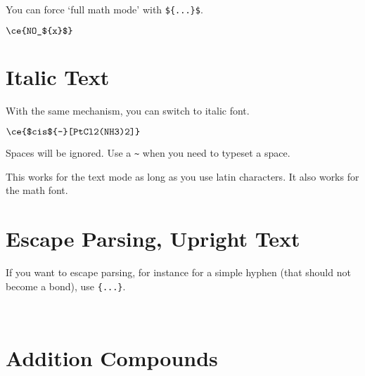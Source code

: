 \documentclass[a4paper,notitlepage,parskip=half]{scrreprt}
\begin{document}
You can force `full math mode' with \verb|${...}$|.

\begin{SideBySideExample}[xrightmargin=4cm]
  $\ce{NO_${x}$}$ \sffamily\bfseries {}
\end{SideBySideExample}


\section{Italic Text}

With the same mechanism, you can switch to italic font.

\begin{SideBySideExample}[xrightmargin=4cm]
  $\ce{$cis${-}[PtCl2(NH3)2]}$\\
  \sffamily\bfseries
\end{SideBySideExample}

Spaces will be ignored. Use a \verb|~| when you need to typeset a space.

This works for the text mode as long as you use latin characters. It also works for the math font.


\section{Escape Parsing, Upright Text}

If you want to escape parsing, for instance for a simple hyphen (that should not become a bond), use \verb|{...}|.

\begin{SideBySideExample}[xrightmargin=4cm]
  \\
  \sffamily\bfseries
\end{SideBySideExample}


\section{Addition Compounds}

\begin{SideBySideExample}[xrightmargin=5cm]
\end{SideBySideExample}

\begin{SideBySideExample}[xrightmargin=5cm]
\end{SideBySideExample}

\begin{SideBySideExample}[xrightmargin=5cm]
\end{SideBySideExample}
\end{document}
